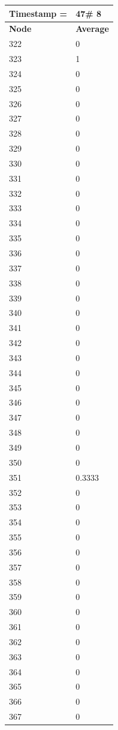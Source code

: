 \begin{tabular}{|l||l|}
\hline
\textbf{Timestamp =} & \textbf{47}\# 8\\\hline
	\textbf{Node} & \textbf{Average} \\ \hline
\hline
	322 & 0 \\ \hline
	323 & 1 \\ \hline
	324 & 0 \\ \hline
	325 & 0 \\ \hline
	326 & 0 \\ \hline
	327 & 0 \\ \hline
	328 & 0 \\ \hline
	329 & 0 \\ \hline
	330 & 0 \\ \hline
	331 & 0 \\ \hline
	332 & 0 \\ \hline
	333 & 0 \\ \hline
	334 & 0 \\ \hline
	335 & 0 \\ \hline
	336 & 0 \\ \hline
	337 & 0 \\ \hline
	338 & 0 \\ \hline
	339 & 0 \\ \hline
	340 & 0 \\ \hline
	341 & 0 \\ \hline
	342 & 0 \\ \hline
	343 & 0 \\ \hline
	344 & 0 \\ \hline
	345 & 0 \\ \hline
	346 & 0 \\ \hline
	347 & 0 \\ \hline
	348 & 0 \\ \hline
	349 & 0 \\ \hline
	350 & 0 \\ \hline
	351 & 0.3333 \\ \hline
	352 & 0 \\ \hline
	353 & 0 \\ \hline
	354 & 0 \\ \hline
	355 & 0 \\ \hline
	356 & 0 \\ \hline
	357 & 0 \\ \hline
	358 & 0 \\ \hline
	359 & 0 \\ \hline
	360 & 0 \\ \hline
	361 & 0 \\ \hline
	362 & 0 \\ \hline
	363 & 0 \\ \hline
	364 & 0 \\ \hline
	365 & 0 \\ \hline
	366 & 0 \\ \hline
	367 & 0 \\ \hline
\end{tabular}
